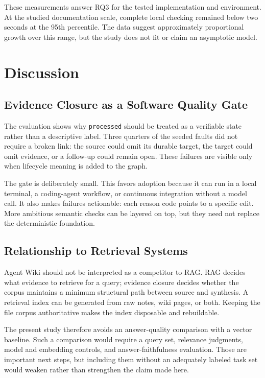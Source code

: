 \documentclass[preprint,12pt,a4paper]{elsarticle}
\begin{document}
These measurements answer RQ3 for the tested implementation and environment.
At the studied documentation scale, complete local checking remained below two
seconds at the 95th percentile. The data suggest approximately proportional
growth over this range, but the study does not fit or claim an asymptotic model.

\section{Discussion}

\subsection{Evidence Closure as a Software Quality Gate}

The evaluation shows why \texttt{processed} should be treated as a verifiable
state rather than a descriptive label. Three quarters of the seeded faults did
not require a broken link: the source could omit its durable target, the target
could omit evidence, or a follow-up could remain open. These failures are
visible only when lifecycle meaning is added to the graph.

The gate is deliberately small. This favors adoption because it can run in a
local terminal, a coding-agent workflow, or continuous integration without a
model call. It also makes failures actionable: each reason code points to a
specific edit. More ambitious semantic checks can be layered on top, but they
need not replace the deterministic foundation.

\subsection{Relationship to Retrieval Systems}

Agent Wiki should not be interpreted as a competitor to RAG. RAG decides what
evidence to retrieve for a query; evidence closure decides whether the corpus
maintains a minimum structural path between source and synthesis. A retrieval
index can be generated from raw notes, wiki pages, or both. Keeping the file
corpus authoritative makes the index disposable and rebuildable.

The present study therefore avoids an answer-quality comparison with a vector
baseline. Such a comparison would require a query set, relevance judgments,
model and embedding controls, and answer-faithfulness evaluation. Those are
important next steps, but including them without an adequately labeled task set
would weaken rather than strengthen the claim made here.
\end{document}
